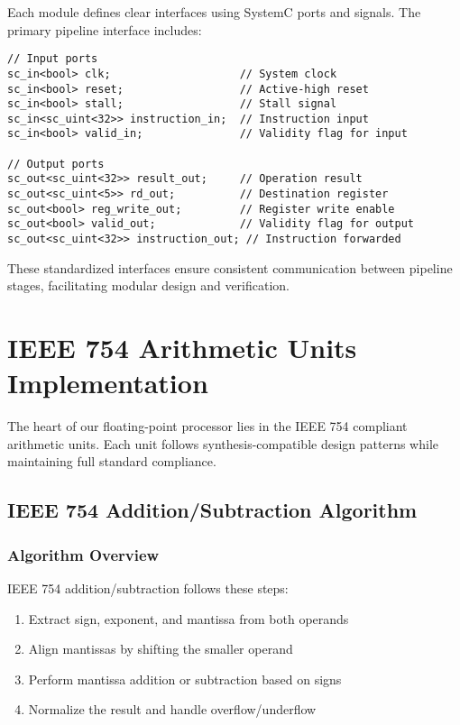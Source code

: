Each module defines clear interfaces using SystemC ports and signals. The primary pipeline interface includes:

\begin{lstlisting}[caption={Pipeline Stage Interface}]
// Input ports
sc_in<bool> clk;                    // System clock
sc_in<bool> reset;                  // Active-high reset
sc_in<bool> stall;                  // Stall signal
sc_in<sc_uint<32>> instruction_in;  // Instruction input
sc_in<bool> valid_in;               // Validity flag for input

// Output ports
sc_out<sc_uint<32>> result_out;     // Operation result
sc_out<sc_uint<5>> rd_out;          // Destination register
sc_out<bool> reg_write_out;         // Register write enable
sc_out<bool> valid_out;             // Validity flag for output
sc_out<sc_uint<32>> instruction_out; // Instruction forwarded
\end{lstlisting}

These standardized interfaces ensure consistent communication between pipeline stages, facilitating modular design and verification.

\section{IEEE 754 Arithmetic Units Implementation}
\label{sec:arithmetic_units}

The heart of our floating-point processor lies in the IEEE 754 compliant arithmetic units. Each unit follows synthesis-compatible design patterns while maintaining full standard compliance.

\subsection{IEEE 754 Addition/Subtraction Algorithm}
\label{subsec:ieee754_addition}

\subsubsection{Algorithm Overview}

IEEE 754 addition/subtraction follows these steps:
\begin{enumerate}
    \item Extract sign, exponent, and mantissa from both operands
    \item Align mantissas by shifting the smaller operand
    \item Perform mantissa addition or subtraction based on signs
    \item Normalize the result and handle overflow/underflow
\end{enumerate}

